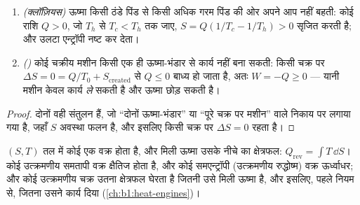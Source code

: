 \begin{proposition}[दो परिणाम]\label{prop:b1:second-law-entropy:clausiuskelvin}
\begin{enumerate}
  \item \emph{(क्लॉज़ियस)} ऊष्मा किसी ठंडे पिंड से किसी अधिक गरम पिंड की
        ओर अपने आप नहीं बहती: कोई राशि $Q > 0$, जो $T_h$ से
        $T_c < T_h$ तक जाए, $S = Q(1/T_c - 1/T_h) > 0$ सृजित करती है; और उलटा
        एन्ट्रॉपी नष्ट कर देता।
  \item \emph{()} कोई चक्रीय मशीन किसी एक ही ऊष्मा-भंडार से कार्य
        नहीं बना सकती: किसी चक्र पर $\Delta S = 0 = Q/T_0 + S_{\mathrm{created}}$
        से $Q \leq 0$ बाध्य हो जाता है, अतः $W = -Q \geq 0$ --- यानी मशीन
        केवल कार्य \emph{ले} सकती है और ऊष्मा छोड़ सकती है।
\end{enumerate}
\end{proposition}

\begin{proof}
दोनों वही संतुलन हैं, जो ``दोनों ऊष्मा-भंडार'' या ``पूरे चक्र पर मशीन''
वाले निकाय पर लगाया गया है, जहाँ $S$ अवस्था फलन है, और इसलिए किसी चक्र पर $\Delta S
= 0$ रहता है।
\end{proof}

\begin{definition}[एन्ट्रॉपी आरेख]\label{def:b1:second-law-entropy:TS}
$(S, T)$ तल में कोई  एक वक्र होता है, और मिली ऊष्मा उसके
नीचे का क्षेत्रफल: $Q_{\mathrm{rev}} = \int T\,\dd S$। कोई उत्क्रमणीय समतापी
वक्र क्षैतिज होता है, और कोई समएन्ट्रॉपी (उत्क्रमणीय रुद्धोष्म) वक्र
ऊर्ध्वाधर; और कोई उत्क्रमणीय चक्र उतना क्षेत्रफल घेरता है जितनी उसे मिली
ऊष्मा है, और इसलिए, पहले नियम से, जितना उसने कार्य दिया
(\cref{ch:b1:heat-engines})।
\end{definition}

